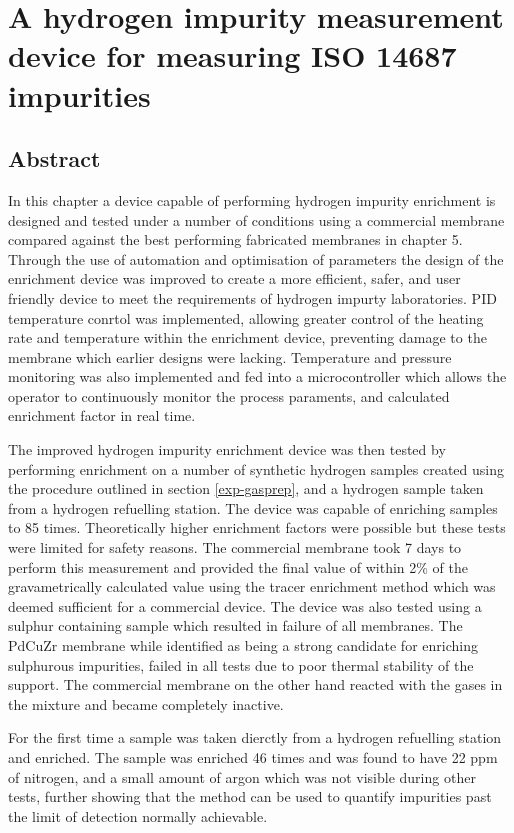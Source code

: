 \chapter{A hydrogen impurity measurement device for measuring ISO 14687 impurities}

\section*{Abstract}
In this chapter a device capable of performing hydrogen impurity enrichment is designed and tested under a number of conditions using a commercial membrane compared against the best performing fabricated membranes in chapter 5. 
Through the use of automation and optimisation of parameters the design of the enrichment device was improved to create a more efficient, safer, and user friendly device to meet the requirements of hydrogen impurty laboratories. PID temperature conrtol was implemented, allowing greater control of the heating rate and temperature within the enrichment device, preventing damage to the membrane which earlier designs were lacking. Temperature and pressure monitoring was also implemented and fed into a microcontroller which allows the operator to continuously monitor the process paraments, and calculated enrichment factor in real time. 

The improved hydrogen impurity enrichment device was then tested by performing enrichment on a number of synthetic hydrogen samples created using the procedure outlined in section \ref{exp-gasprep}, and a hydrogen sample taken from a hydrogen refuelling station. The device was capable of enriching samples to 85 times. Theoretically higher enrichment factors were possible but these tests were limited for safety reasons. The commercial membrane took 7 days to perform this measurement and provided the final value of within 2\% of the gravametrically calculated value using the tracer enrichment method which was deemed sufficient for a commercial device. The device was also tested using a sulphur containing sample which resulted in failure of all membranes. The PdCuZr membrane while identified as being a strong candidate for enriching sulphurous impurities, failed in all tests due to poor thermal stability of the support. The commercial membrane on the other hand reacted with the gases in the mixture and became completely inactive. 

For the first time a sample was taken dierctly from a hydrogen refuelling station and enriched. The sample was enriched 46 times and was found to have 22 ppm of nitrogen, and a small amount of argon which was not visible during other tests, further showing that the method can be used to quantify impurities past the limit of detection normally achievable.   

